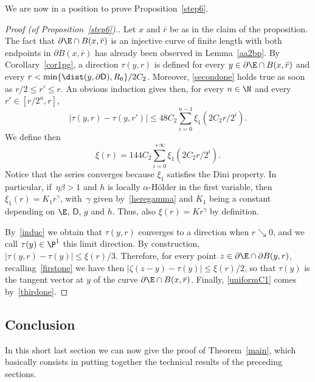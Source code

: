 We are now in a position to prove Proposition~\ref{step6}.

\begin{proof}[Proof (of Proposition~\ref{step6}).]
Let $x$ and $\bar r$ be as in the claim of the proposition. The fact that $\partial\E\cap B(x,\bar r)$ is an injective curve of finite length with both endpoints in $\partial B(x,\bar r)$ has already been observed in Lemma~\ref{aa2bp}. By Corollary~\ref{cor1pg}, a direction $\tau(y,r)$ is defined for every $y\in \partial\E\cap B(x,\bar r)$ and every $r<\min\{\dist (y,\partial \mathsf{D}),R_6\}/2C_2$. Moreover, \eqref{secondone} holds true as soon as $r/2\leq r'\leq r$. An obvious induction gives then, for every $n\in\N$ and every $r'\in[r/2^n,r]$,
\begin{equation}\label{induc}
|\tau(y,r)-\tau(y,r')| \leq 48 C_2 \sum_{i=0}^{n-1} \xi_1(2C_2 r/2^i).
\end{equation}
We define then
\[
\xi(r) = 144 C_2 \sum_{i=0}^{+\infty} \xi_1(2C_2 r/2^i).
\]
Notice that the series converges because $\xi_1$ satisfies the Dini property. In particular, if~$\eta\beta>1$ and $h$ is locally $\alpha$-H\"older in the first variable, then $\xi_1(r)=K_1 r^\gamma$, with~$\gamma$ given by~\eqref{heregamma} and $K_1$ being a constant depending on $\E$, $\mathsf{D}$, $g$ and $h$. Thus, also $\xi(r)=K r^\gamma$ by definition.

By~\eqref{induc} we obtain that $\tau(y,r)$ converges to a direction when $r\searrow 0$, and we call $\tau(y)\in\P^1$ this limit direction. By construction, $|\tau(y,r)-\tau(y)|\leq \xi(r)/3$. Therefore, for every point $z\in \partial\E\cap \partial B(y,r)$, recalling~\eqref{firstone} we have then $|\zeta(z-y)-\tau(y)|\leq \xi(r)/2$, so that $\tau(y)$ is the tangent vector at $y$ of the curve $\partial\E\cap B(x,\bar r)$. Finally, \eqref{uniformC1} comes by~\eqref{thirdone}.
\end{proof}

\subsection{Conclusion}

In this short last section we can now give the proof of Theorem~\ref{main}, which basically consists in putting together the technical results of the preceding sections.

